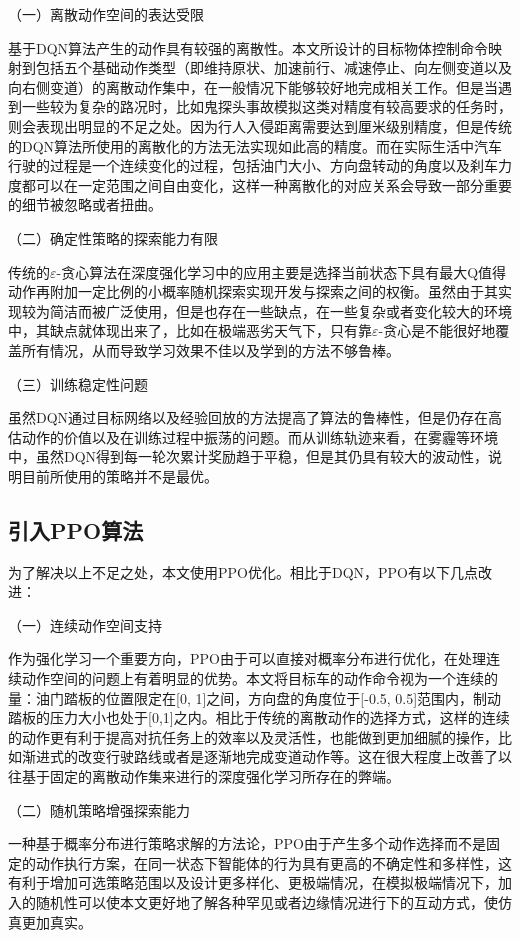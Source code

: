 （一）离散动作空间的表达受限

基于DQN算法产生的动作具有较强的离散性。本文所设计的目标物体控制命令映射到包括五个基础动作类型（即维持原状、加速前行、减速停止、向左侧变道以及向右侧变道）的离散动作集中，在一般情况下能够较好地完成相关工作。但是当遇到一些较为复杂的路况时，比如鬼探头事故模拟这类对精度有较高要求的任务时，则会表现出明显的不足之处。因为行人入侵距离需要达到厘米级别精度，但是传统的DQN算法所使用的离散化的方法无法实现如此高的精度。而在实际生活中汽车行驶的过程是一个连续变化的过程，包括油门大小、方向盘转动的角度以及刹车力度都可以在一定范围之间自由变化，这样一种离散化的对应关系会导致一部分重要的细节被忽略或者扭曲。

（二）确定性策略的探索能力有限

传统的$\varepsilon$-贪心算法在深度强化学习中的应用主要是选择当前状态下具有最大Q值得动作再附加一定比例的小概率随机探索实现开发与探索之间的权衡。虽然由于其实现较为简洁而被广泛使用，但是也存在一些缺点，在一些复杂或者变化较大的环境中，其缺点就体现出来了，比如在极端恶劣天气下，只有靠$\varepsilon$-贪心是不能很好地覆盖所有情况，从而导致学习效果不佳以及学到的方法不够鲁棒。

（三）训练稳定性问题

虽然DQN通过目标网络以及经验回放的方法提高了算法的鲁棒性，但是仍存在高估动作的价值以及在训练过程中振荡的问题。而从训练轨迹来看，在雾霾等环境中，虽然DQN得到每一轮次累计奖励趋于平稳，但是其仍具有较大的波动性，说明目前所使用的策略并不是最优。
\subsection{引入PPO算法}
为了解决以上不足之处，本文使用PPO优化。相比于DQN，PPO有以下几点改进：

（一）连续动作空间支持

作为强化学习一个重要方向，PPO由于可以直接对概率分布进行优化，在处理连续动作空间的问题上有着明显的优势。本文将目标车的动作命令视为一个连续的量：油门踏板的位置限定在[0, 1]之间，方向盘的角度位于[-0.5, 0.5]范围内，制动踏板的压力大小也处于[0,1]之内。相比于传统的离散动作的选择方式，这样的连续的动作更有利于提高对抗任务上的效率以及灵活性，也能做到更加细腻的操作，比如渐进式的改变行驶路线或者是逐渐地完成变道动作等。这在很大程度上改善了以往基于固定的离散动作集来进行的深度强化学习所存在的弊端\cite{fei2023improved}。

（二）随机策略增强探索能力

一种基于概率分布进行策略求解的方法论，PPO由于产生多个动作选择而不是固定的动作执行方案，在同一状态下智能体的行为具有更高的不确定性和多样性，这有利于增加可选策略范围以及设计更多样化、更极端情况，在模拟极端情况下，加入的随机性可以使本文更好地了解各种罕见或者边缘情况进行下的互动方式，使仿真更加真实。

